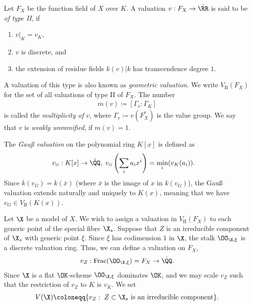 \begin{definition}
    Let $F_X$ be the function field of $X$ over $K$.
    A valuation $v: F_X \to \hat{\RR}$ is said to be \textit{of type \textrm{II}}, if
    \begin{enumerate}
        \item $v|_K = v_K$,
        \item $v$ is discrete, and
        \item the extension of residue fields $k(v)|k$ has transcendence degree $1$.
    \end{enumerate}
    A valuation of this type is also known as \textit{geometric valuation}.
    We write $V_\textrm{II}(F_X)$ for the set of all valuations of type \textrm{II} of $F_X$.
    The number
    \begin{align}
        m(v) \coloneqq [\Gamma_v : \Gamma_K]
    \end{align}
    is called the \textit{multiplicity of $v$}, where $\Gamma_v \coloneqq v(F_X^*)$ is the value group.
    We say that $v$ is \textit{weakly unramified}, if $m(v) = 1$.
\end{definition}

\begin{example}
    The \textit{Gauß valuation} on the polynomial ring $K[x]$ is defined as
    \begin{align}
        v_{\scriptscriptstyle G}: K[x] &\to \hat{\QQ}, \; v_{\scriptscriptstyle G}\left( \sum_i a_i x^{i} \right) = \min_i(v_K(a_i)).
    \end{align}
    Since $k(v_{\scriptscriptstyle G}) = k(\bar{x})$ (where $\bar{x}$ is the image of $x$ in $k(v_{\scriptscriptstyle G})$), the Gauß valuation
    extends naturally and uniquely to $K(x)$, meaning that we have $v_{\scriptscriptstyle G} \in V_\textrm{II}(K(x))$.
\end{example}

Let $\X$ be a model of $X$.
We wish to assign a valuation in $V_\textrm{II}(F_X)$ to each generic point of the special fibre $\X_s$.
Suppose that $Z$ is an irreducible component of $\X_s$ with generic point $\xi$.
Since $\xi$ has codimension $1$ in $\X$, the stalk $\OO_{\X,\xi}$ is a discrete valuation ring\@.
Thus, we can define a valuation on $F_X$,
\begin{align} \label{eq:ValuationOfComponent}
    v_Z: \mathrm{Frac}(\OO_{\X, \xi}) = F_X \to \hat{\QQ}.
\end{align}
Since $\X$ is a flat $\OK $-scheme $\OO_{\X, \xi}$ dominates $\OK$, and we may scale $v_Z$ such that the restriction of $v_Z$ to $K$ is $v_K$.
We set
\begin{align}
    V(\X) \coloneqq \lbrace v_Z: \; Z \subset \X_s \text{ is an irreducible component}\rbrace.
\end{align}


